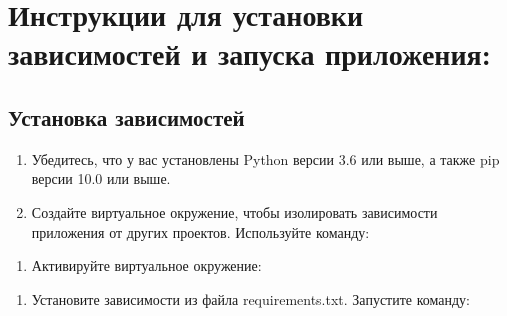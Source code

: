 \documentclass[letterpaper,10pt,russian]{sphinxmanual}
\begin{document}
\chapter{Инструкции для установки зависимостей и запуска приложения:}
\label{\detokenize{README:id4}}

\section{Установка зависимостей}
\label{\detokenize{README:id5}}\begin{enumerate}
%
\item {} 
\sphinxAtStartPar
Убедитесь, что у вас установлены Python версии 3.6 или выше, а также pip версии 10.0 или выше.

\item {} 
\sphinxAtStartPar
Создайте виртуальное окружение, чтобы изолировать зависимости приложения от других проектов. Используйте команду:

\end{enumerate}

\begin{sphinxVerbatim}[commandchars=\\\{\}]
   
\end{sphinxVerbatim}
\begin{enumerate}
%
\setcounter{enumi}{2}
\item {} 
\sphinxAtStartPar
Активируйте виртуальное окружение:

\end{enumerate}

\begin{sphinxVerbatim}[commandchars=\\\{\}]
 
\end{sphinxVerbatim}
\begin{enumerate}
%
\setcounter{enumi}{3}
\item {} 
\sphinxAtStartPar
Установите зависимости из файла requirements.txt. Запустите команду:

\end{enumerate}

\begin{sphinxVerbatim}[commandchars=\\\{\}]
    
\end{sphinxVerbatim}
\end{document}

